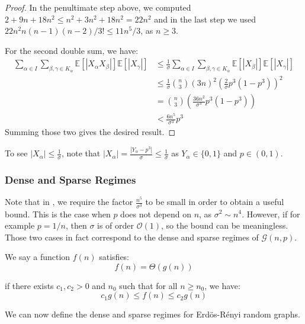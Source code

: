 \documentclass{article}
\begin{document}
\begin{proof}
    In the penultimate step above, we computed $2 + 9n + 18n^2 \leq n^2 + 3n^2 + 18n^2 = 22n^2$ and in the last step we used $22n^2 n(n-1)(n-2)/3! \leq 11 n^5/3$, as $n\geq 3$.

    For the second double sum, we have:
    \begin{align*}
        \sum_{\alpha\in I}\sum_{\beta,\gamma\in K_{\alpha}}\mathbb{E}[|X_{\alpha}X_{\beta}|]\mathbb{E}[|X_{\gamma}|] &\leq \frac{1}{\sigma}  \sum_{\alpha\in I}\sum_{\beta,\gamma\in K_{\alpha}}\mathbb{E}[|X_{\beta}|] \mathbb{E}[|X_{\gamma}|] \\
        &\leq \frac{1}{\sigma} \binom{n}{3} (3n)^2 \left(\frac{2}{\sigma}p^{3}(1-p^{3})\right)^2 \\
        &=\binom{n}{3} \left(\frac{36n^2}{\sigma^3}p^{3}(1-p^{3})\right) \\
        &< \frac{6n^5}{\sigma^3} p^3
    \end{align*}
    Summing those two gives the desired result.
\end{proof}

\begin{remark}
    To see $|X_\alpha| \leq \frac{1}{\sigma}$, note that $|X_\alpha| = \frac{|Y_\alpha - p^3|}{\sigma} \leq \frac{1}{\sigma}$ as $Y_\alpha \in \{0,1\}$ and $p\in (0,1)$.
\end{remark}

\subsubsection{Dense and Sparse Regimes}  

Note that in , we require the factor $\frac{n^5}{\sigma^3}$ to be small in order to obtain a useful bound. This is the case when $p$ does not depend on $n$, as $\sigma^2 \sim n^4$. However, if for example $p=1/n$, then $\sigma$ is of order $\mathcal{O}(1)$, so the bound can be meaningless.  Those two cases in fact correspond to the dense and sparse regimes of $\mathcal{G}(n,p)$.  

\begin{definition}
    We say a function $f(n)$ satisfies:
    \[
        f(n) = \Theta(g(n))
        \]

    if there exists $c_1, c_2 > 0$ and $n_0$ such that for all $n\geq n_0$, we have:
    \[
        c_1 g(n) \leq f(n) \leq c_2 g(n)
    \]
\end{definition}

We can now define the dense and sparse regimes for Erd\"os-R\'enyi random graphs.
\end{document}
